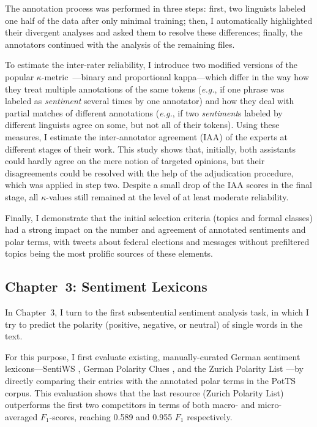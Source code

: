 \documentclass[11pt]{article}
\newcommand{\eg}{\textit{e.g.},}
\newcommand{\F}[0]{$F_1$}
\renewcommand{\cite}{\citep}
\begin{document}
The annotation process was performed in three steps: first, two
linguists labeled one half of the data after only minimal training;
then, I automatically highlighted their divergent analyses and asked
them to resolve these differences; finally, the annotators continued
with the analysis of the remaining files.

To estimate the inter-rater reliability, I introduce two modified
versions of the popular $\kappa$-metric~\cite{Cohen:60}---binary and
proportional kappa---which differ in the way how they treat multiple
annotations of the same tokens (\eg{} if one phrase was labeled as
\emph{sentiment} several times by one annotator) and how they deal
with partial matches of different annotations (\eg{} if two
\emph{sentiment}s labeled by different linguists agree on some, but
not all of their tokens).  Using these measures, I estimate the
inter-annotator agreement (IAA) of the experts at different stages of
their work.  This study shows that, initially, both assistants could
hardly agree on the mere notion of targeted opinions, but their
disagreements could be resolved with the help of the adjudication
procedure, which was applied in step two.  Despite a small drop of the
IAA scores in the final stage, all $\kappa$-values still remained at
the level of at least moderate reliability.

Finally, I demonstrate that the initial selection criteria (topics and
formal classes) had a strong impact on the number and agreement of
annotated sentiments and polar terms, with tweets about federal
elections and messages without prefiltered topics being the most
prolific sources of these elements.

\subsection{Chapter~3: Sentiment Lexicons}

In Chapter~3, I turn to the first subsentential sentiment analysis
task, in which I try to predict the polarity (positive, negative, or
neutral) of single words in the text.

For this purpose, I first evaluate existing, manually-curated German
sentiment lexicons---SentiWS \cite{Remus:10}, German Polarity Clues
\cite{Waltinger:10}, and the Zurich Polarity List
\cite{Clematide:10}---by directly comparing their entries with the
annotated polar terms in the PotTS corpus.  This evaluation shows that
the last resource (Zurich Polarity List) outperforms the first two
competitors in terms of both macro- and micro-averaged \F{}-scores,
reaching 0.589 and 0.955 \F{} respectively.
\end{document}

